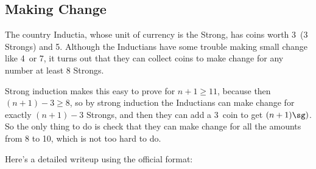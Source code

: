\subsection{Making Change}

The country Inductia, whose unit of currency is the Strong, has coins
worth 3\sg\ (3 Strongs) and 5\sg.  Although the Inductians have some
trouble making small change like 4\sg\ or 7\sg, it turns out that they can
collect coins to make change for any number at least 8 Strongs.

Strong induction makes this easy to prove for $n+1 \ge 11$, because then
$(n+1)-3 \ge 8$, so by strong induction the Inductians can make change for
exactly $(n+1)-3$ Strongs, and then they can add a 3\sg\ coin to get
$(n+1)\sg)$.  So the only thing to do is check that they can make change
for all the amounts from 8 to 10\sg, which is not too hard to do.

Here's a detailed writeup using the official format:

